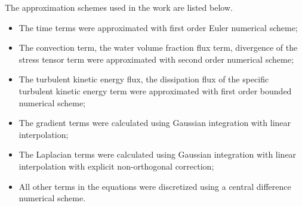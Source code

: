 \documentclass[mathematics,article,submit,pdftex,moreauthors]{Definitions/mdpi}
\begin{document}

The approximation schemes used in the work are listed below.
\begin{itemize}
	\item The time terms were approximated with first order Euler numerical scheme;
	\item The convection term, the water volume fraction flux term, divergence of the stress tensor term were approximated with second order numerical scheme;
	\item The turbulent kinetic energy flux, the dissipation flux of the specific turbulent kinetic energy term were approximated with first order bounded numerical scheme;
	\item The gradient terms were calculated using Gaussian integration with linear interpolation;
	\item The Laplacian terms were calculated using Gaussian integration with linear interpolation with explicit non-orthogonal correction;
	\item All other terms in the equations were discretized using a central difference numerical scheme.
\end{itemize}
\end{document}
